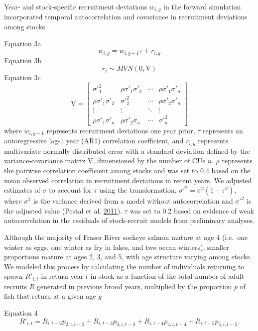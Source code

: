 \documentclass[11pt]{book}
\begin{document}
Year- and stock-specific recruitment deviations \(w_{i,y}\) in the forward simulation incorporated temporal autocorrelation and covariance in recruitment deviations among stocks

Equation 3a \[w_{i,y} = w_{i,y-1}\tau + r_{i,y}\] Equation 3b \[r_i \sim MVN(0, \boldsymbol{\mathrm{V}})\] Equation 3c \[\boldsymbol{\mathrm{V}} =
 \begin{bmatrix}
  \sigma'^2_1 & \rho\sigma'_1\sigma'_2 & \cdots & \rho\sigma'_1\sigma'_n \\
  \rho\sigma'_1\sigma'_2 & \sigma'^2_2 & \cdots & \rho\sigma'_2\sigma'_n \\
  \vdots  & \vdots  & \ddots & \vdots  \\
  \rho\sigma'_1\sigma'_n & \rho\sigma'_2\sigma_n & \cdots & \sigma'^2_n
 \end{bmatrix}\]
where \(w_{i,y-1}\) represents recruitment deviations one year prior, \(\tau\) represents an autoregressive lag-1 year (AR1) correlation coefficient, and \(r_{i,y}\) represents multivariate normally distributed error with a standard deviation defined by the variance-covariance matrix \(\boldsymbol{\mathrm{V}}\), dimensioned by the number of CUs \(n\). \(\rho\) represents the pairwise correlation coefficient among stocks and was set to \(0.4\) based on the mean observed correlation in recruitment deviations in recent years. We adjusted estimates of \(\sigma\) to account for \(\tau\) using the transformation, \(\sigma'^2 = \sigma^2(1-\tau^2 )\), where \(\sigma^2\) is the variance derived from a model without autocorrelation and \(\sigma'^2\) is the adjusted value (Pestal et al. \protect\hyperlink{ref-Pestal2011}{2011}). \(\tau\) was set to 0.2 based on evidence of weak autocorrelation in the residuals of stock-recruit models from preliminary analyses.

Although the majority of Fraser River sockeye salmon mature at age 4 (i.e.~one winter as eggs, one winter as fry in lakes, and two ocean winters), smaller proportions mature at ages 2, 3, and 5, with age structure varying among stocks We modeled this process by calculating the number of individuals returning to spawn \(R'_{i,t}\) in return year \(t\) in stock as a function of the total number of adult recruits \(R\) generated in previous brood years, multiplied by the proportion \(p\) of fish that return at a given age \(g\)

Equation 4 \[ R'_{i,t} = R_{i,t-2}p_{2,i,t-2} + R_{i,t-3}p_{3,i,t-3} + R_{i,t-4}p_{4,i,t-4} + R_{i,t-5}p_{5,i,t-5}. \]
\end{document}
